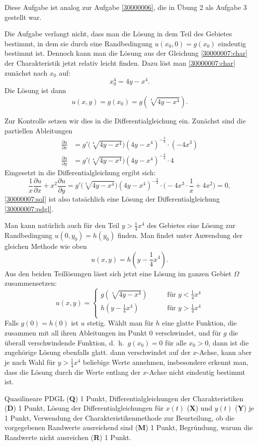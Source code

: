 \begin{diskussion}
Diese Aufgabe ist analog zur Aufgabe \ref{30000006}, die in
Übung 2 als Aufgabe 3 gestellt war.

Die Aufgabe verlangt nicht, dass man die Lösung in dem Teil des
Gebietes bestimmt, in dem sie durch eine Randbedingung
$u(x_0,0)=g(x_0)$ eindeutig bestimmt ist. Dennoch kann man die
Lösung aus der Gleichung \eqref{30000007:char} der Charakteristik
jetzt relativ leicht finden. Dazu löst man \eqref{30000007:char}
zunächst nach $x_0$ auf:
\[
x_0^4 = 4y-x^4.
\]
Die Lösung ist dann
\begin{equation}
u(x,y)=g(x_0)
=
g(\sqrt[4]{4y-x^4}).
\label{30000007:sol}
\end{equation}

Zur Kontrolle setzen wir dies in die Differentialgleichung ein.
Zunächst sind die partiellen Ableitungen
\begin{align*}
\frac{\partial u}{\partial x}
&=
g'\bigl(\sqrt[4]{4y-x^4}\bigr) (4y-x^4)^{-\frac34}
\cdot (-4x^3)
\\
\frac{\partial u}{\partial y}
&=
g'\bigl(\sqrt[4]{4y-x^4}\bigr) (4y-x^4)^{-\frac34}
\cdot 4
\end{align*}
Eingesetzt in die Differentialgleichung ergibt sich:
\[
\frac1x\frac{\partial u}{\partial x}+x^2\frac{\partial u}{\partial y}=
g'\bigl(\sqrt[4]{4y-x^4}\bigr) (4y-x^4)^{-\frac34}
\cdot
\biggl(
-4x^3\cdot\frac1x+4x^2
\biggr)=0,
\]
\eqref{30000007:sol} ist also tatsächlich eine Lösung der
Differentialgleichung
\eqref{30000007:pdgl}.

Man kann natürlich auch für den Teil $y>\frac14x^4$ des
Gebietes eine Lösung zur Randbedingung $u(0,y_0)=h(y_0)$ finden.
Man findet unter Anwendung der gleichen Methode wie oben 
\[
u(x,y)=h(y-{\textstyle\frac14}x^4).
\]
Aus den beiden Teillösungen lässt sich jetzt eine Lösung im
ganzen Gebiet $\Omega$ zusammensetzen: 
\[
u(x,y)=\begin{cases}
g(\sqrt[4]{4y-x^4})&\qquad \text{für $y<\frac14x^4$}\\
h(y-\frac14x^4)&\qquad \text{für $y>\frac14x^4$}\\
\end{cases}
\]
Falls $g(0)=h(0)$ ist $u$ stetig. Wählt man für $h$ eine glatte
Funktion, die zusammen mit all ihren Ableitungen im Punkt $0$
verschwindet, und für $g$ die überall verschwindende Funktion,
d.~h.~$g(x_0)=0$ für alle $x_0>0$, dann ist die zugehörige Lösung
ebenfalls glatt. dann verschwindet auf der $x$-Achse,
kann aber je nach Wahl für $y>\frac14x^4$ beliebige Werte
annehmen, insbesondere erkennt man, dass die Lösung durch die
Werte entlang der $x$-Achse nicht eindeutig bestimmt ist.
\end{diskussion}

\begin{bewertung}
Quasilineare PDGL ({\bf Q}) 1 Punkt,
Differentialgleichungen der Charakteristiken ({\bf D}) 1 Punkt,
Lösung der Differentialgleichungen für $x(t)$ ({\bf X}) 
und $y(t)$ ({\bf Y}) je 1 Punkt,
Verwendung der Charakteristikenmethode zur Beurteilung, ob die
vorgegebenen Randwerte ausreichend sind ({\bf M}) 1 Punkt,
Begründung, warum die Randwerte nicht ausreichen ({\bf R}) 1 Punkt.
\end{bewertung}
